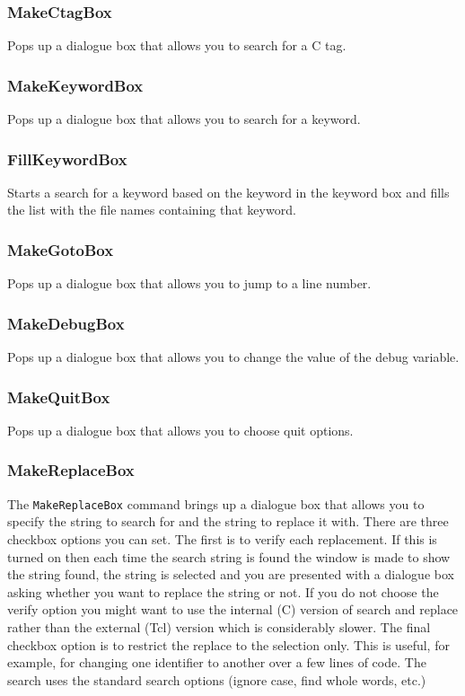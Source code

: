 \subsubsection{MakeCtagBox}
Pops up a dialogue box that allows you to search for a C tag.

\subsubsection{MakeKeywordBox}
Pops up a dialogue box that allows you to search for a keyword.

\subsubsection{FillKeywordBox}
Starts a search for a keyword based on the keyword in
the keyword box and fills the list with the file names
containing that keyword.

\subsubsection{MakeGotoBox}
Pops up a dialogue box that allows you to jump to a line number.

\subsubsection{MakeDebugBox}
Pops up a dialogue box that allows you to change the value
of the debug variable.

\subsubsection{MakeQuitBox}
Pops up a dialogue box that allows you to choose quit options.

\subsubsection{MakeReplaceBox}
The {\tt MakeReplaceBox} command brings up a dialogue box
that allows you to specify
the string to search for and the string to replace it with.
There are three checkbox options you can set.
The first is to verify each replacement.
If this is turned on then each time the search string is found
the window is made to show the string found, the string is
selected and you
are presented with a dialogue box asking whether you want
to replace the string or not.
If you do not choose the verify option you might want to use the
internal (C) version of search and replace rather than the external
(Tcl) version which is considerably slower.
The final checkbox option is to restrict the replace to the selection
only.
This is useful, for example, for changing one identifier to another
over a few lines of code.
The search uses the standard search options (ignore case, find
whole words, etc.)

